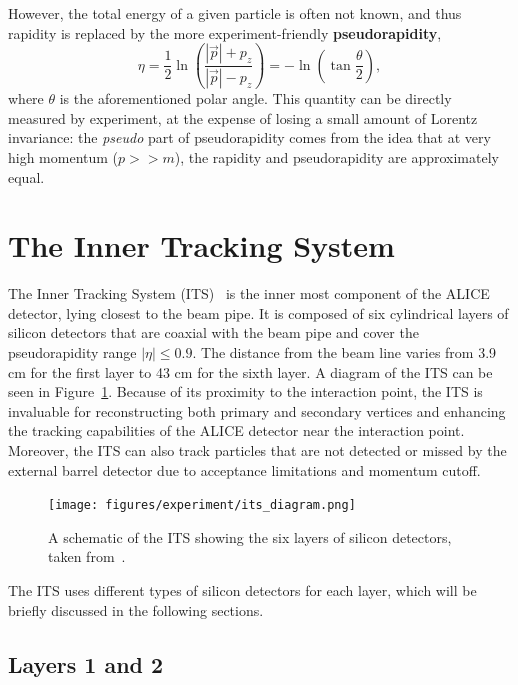 However, the total energy of a given particle is often not known, and thus rapidity is replaced by the more experiment-friendly \textbf{pseudorapidity}, 
\begin{equation}
    \eta = \frac{1}{2} \ln \left( \frac{|\vec{p}| + p_{z}}{|\vec{p}| - p_{z}} \right) 
        = -\ln \left( \tan \frac{\theta}{2} \right),
\end{equation}
where $\theta$ is the aforementioned polar angle. This quantity can be directly measured by experiment, at the expense of losing a small amount of Lorentz invariance: the \textit{pseudo} part of pseudorapidity comes from the idea that at very high momentum ($p >> m$), the rapidity and pseudorapidity are approximately equal.

\section{The Inner Tracking System}
\label{sec:its}

The Inner Tracking System (ITS)~\cite{ITS} is the inner most component of the ALICE detector, lying closest to the beam pipe. It is composed of six cylindrical layers of silicon detectors that are coaxial with the beam pipe and cover the pseudorapidity range $|\eta| \leq 0.9$. The distance from the beam line varies from 3.9 cm for the first layer to 43 cm for the sixth layer. A diagram of the ITS can be seen in Figure~\ref{fig:its_schematic}. Because of its proximity to the interaction point, the ITS is invaluable for reconstructing both primary and secondary vertices and enhancing the tracking capabilities of the ALICE detector near the interaction point. Moreover, the ITS can also track particles that are not detected or missed by the external barrel detector due to acceptance limitations and momentum cutoff. 

\begin{figure}
    \centering
    \texttt{[image: figures/experiment/its\_diagram.png]}
    \caption{A schematic of the ITS showing the six layers of silicon detectors, taken from~\cite{ITSDiagram}.}
    \label{fig:its_schematic}
\end{figure}

The ITS uses different types of silicon detectors for each layer, which will be briefly discussed in the following sections.

\subsection{Layers 1 and 2}

